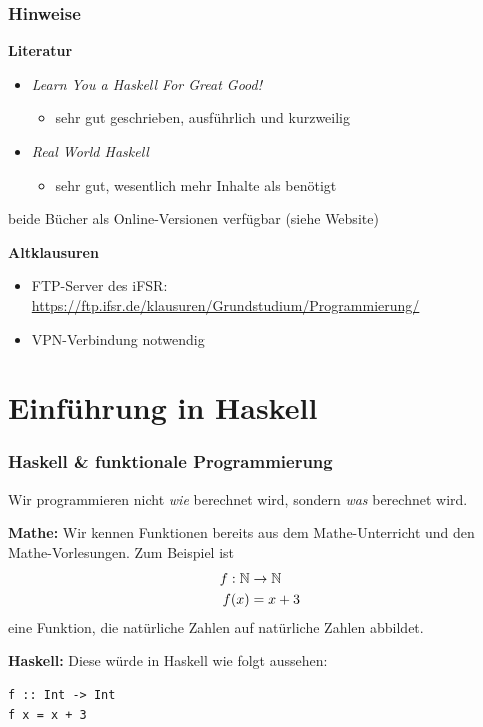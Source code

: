 \documentclass{beamer}
\begin{document}
	\begin{frame} \frametitle{Hinweise}
		\textbf{Literatur}
		\begin{itemize}
			\item \textit{Learn You a Haskell For Great Good!}
			\begin{itemize}
				\item sehr gut geschrieben, ausführlich und kurzweilig
			\end{itemize}
			\item \textit{Real World Haskell}
			\begin{itemize}
				\item sehr gut, wesentlich mehr Inhalte als benötigt
			\end{itemize}
		\end{itemize}
		beide Bücher als Online-Versionen verfügbar (siehe Website)
		
		\medskip \pause
		
		\textbf{Altklausuren}
		\begin{itemize}
			\item FTP-Server des iFSR:
			\url{https://ftp.ifsr.de/klausuren/Grundstudium/Programmierung/}
			\item VPN-Verbindung notwendig
		\end{itemize}
	\end{frame}

\section{Einführung in Haskell}

    \begin{frame}[fragile] \frametitle{Haskell \& funktionale Programmierung}
    	\footnotesize
        
        Wir programmieren nicht \textit{wie} berechnet wird, sondern \textit{was} berechnet wird.
    	
    	\pause
        \medskip
        
        \textbf{Mathe:} Wir kennen Funktionen bereits aus dem Mathe-Unterricht und den Mathe-Vorlesungen. Zum Beispiel ist 
        \begin{equation*}
        	\begin{aligned}
        		f : \mathbb{N} &\to \mathbb{N} \\
        		f(x) &= x + 3
        	\end{aligned}
        \end{equation*}
    	eine Funktion, die natürliche Zahlen auf natürliche Zahlen abbildet.
    	
    	\pause
    	
    	\textbf{Haskell:} 
    	Diese würde in Haskell wie folgt aussehen:
        \begin{lstlisting}[style=bg]
f :: Int -> Int
f x = x + 3
        \end{lstlisting}
    \end{frame}
\end{document}

